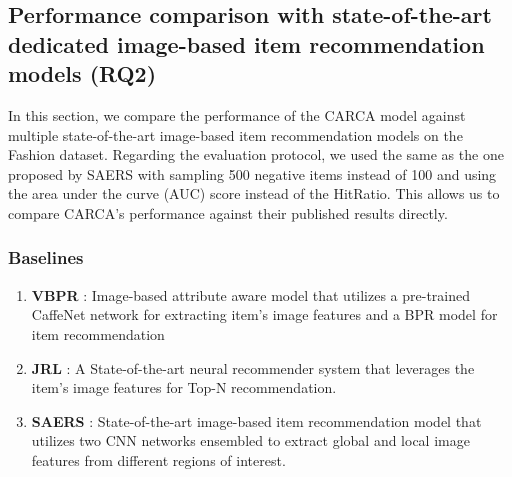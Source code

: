 \documentclass[sigconf,natbib=true]{acmart}
\begin{document}
\subsection{Performance comparison with state-of-the-art dedicated image-based item recommendation models (RQ2)}
In this section, we compare the performance of the CARCA model against multiple state-of-the-art image-based item recommendation models on the Fashion dataset. Regarding the evaluation protocol, we used the same as the one proposed by SAERS \cite{ijcai2019650} with sampling 500 negative items instead of 100 and using the area under the curve (AUC) score instead of the HitRatio. This allows us to compare CARCA's performance against their published results directly.

\subsubsection{Baselines}
\begin{enumerate}
 \item \textbf{VBPR} \cite{he2016vbpr}: Image-based attribute aware model that utilizes a pre-trained CaffeNet network for extracting item's image features and a BPR model for item recommendation
 \item \textbf{JRL} \cite{zhang2017joint}: A State-of-the-art neural recommender system that leverages the item's image features for Top-N recommendation.
  \item \textbf{SAERS} \cite{ijcai2019650}: State-of-the-art image-based item recommendation model that utilizes two CNN networks ensembled to extract global and local image features from different regions of interest.
\end{enumerate}
\end{document}
